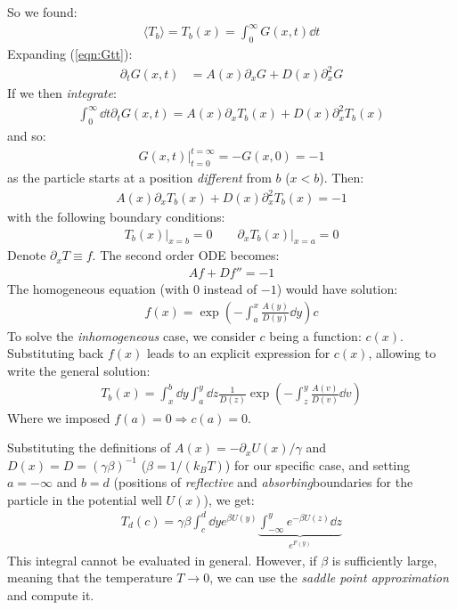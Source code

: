 \documentclass[../template.tex]{subfiles}
\begin{document}
So we found:
\begin{align*}
    \langle T_b \rangle = T_b(x) = \int_0^\infty G(x,t) \dd{t}
\end{align*}
Expanding (\ref{eqn:Gtt}):
\begin{align*}
    \partial_t G(x,t) &= A(x) \partial_x G + D(x) \partial_x^2 G 
\end{align*}
If we then \textit{integrate}:
\begin{align*}
    \int_0^\infty \dd{t} \partial_t G(x,t) = A(x) \partial_x T_b(x) + D(x) \partial_x^2 T_b(x)
\end{align*} 
and so:
\begin{align*}
    G(x,t)\Big|_{t=0}^{t=\infty} = - G(x,0) = -1
\end{align*}
as the particle starts at a position \textit{different} from $b$ ($x < b$). Then:
\begin{align*}
    A(x) \partial_x T_b(x) + D(x) \partial_x^2 T_b(x) = -1
\end{align*}  
with the following boundary conditions:
\begin{align*}
    T_b(x) \Big|_{x=b} = 0 \qquad \partial_x T_b(x) \Big|_{x=a} = 0
\end{align*}
Denote $\partial_x T \equiv f$. The second order ODE becomes:
\begin{align*}
    Af + D f'' = -1
\end{align*} 
The homogeneous equation (with $0$ instead of $-1$) would have solution:
\begin{align*}
    f(x) = \exp\left(-\int_a^x \frac{A(y)}{D(y)}\dd{y} \right) c 
\end{align*}
To solve the \textit{inhomogeneous} case, we consider $c$ being a function: $c(x)$. Substituting back $f(x)$ leads to an explicit expression for $c(x)$, allowing to write the general solution:
\begin{align*}
    T_b(x) = \int_x^b \dd{y} \int_a^y \dd{z} \frac{1}{D(z)} \exp\left(-\int_z^y \frac{A(v)}{D(v)} \dd{v} \right) 
\end{align*}     
Where we imposed $f(a) = 0 \Rightarrow c(a) = 0$. 

Substituting the definitions of $A(x) = -\partial_x U(x)/\gamma$ and $D(x) = D = (\gamma \beta)^{-1}$ ($\beta= 1/(k_B T)$) for our specific case, and setting $a = -\infty$ and $b = d$ (positions of \textit{reflective} and \textit{absorbing}boundaries for the particle in the potential well $U(x)$), we get:
\begin{align*}
    T_d(c) = \gamma \beta \int_c^d \dd{y} e^{\beta U(y)} \underbrace{\int_{-\infty}^y e^{-\beta U(z)}\dd{z}}_{e^{F(y)}} 
\end{align*}
This integral cannot be evaluated in general. However, if $\beta$ is sufficiently large, meaning that the temperature $T \to 0$, we can use the \textit{saddle point approximation} and compute it.
\end{document}
